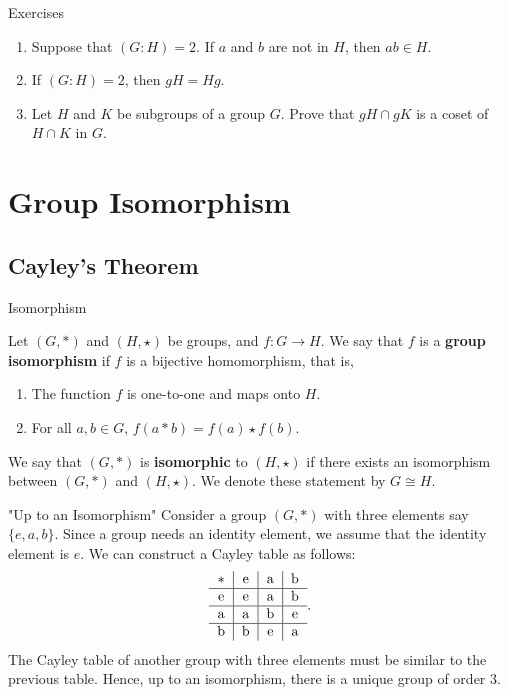 \documentclass{beamer}
\begin{document}
\begin{frame}{Exercises}
    \begin{enumerate}
    \justifying
        \item Suppose that $(G:H)=2$. If $a$ and $b$ are not in $H$, then $ab \in H$.
        \item If $(G:H) = 2$, then $gH = Hg$.
        \item Let $H$ and $K$ be subgroups of a group $G$. Prove that $gH \cap gK$ is a coset of $H \cap K$ in $G$.
    \end{enumerate}
\end{frame}

\section{Group Isomorphism}

\subsection{Cayley's Theorem}

\begin{frame}{Isomorphism}
\begin{definition}
\justifying
Let $(G, *)$ and $(H, \star)$ be groups, and $f : G \rightarrow H$. We say that $f$ is a \textbf{group isomorphism} if $f$ is a bijective homomorphism, that is,
\begin{enumerate}
\justifying
\item The function $f$ is one-to-one and maps onto $H$.
\item For all $a, b \in G$, $f(a * b) = f(a) \star f(b)$.
\end{enumerate}
We say that $(G, *)$ is \textbf{isomorphic} to $(H, \star)$ if there exists an isomorphism between $(G, *)$ and $(H, \star)$. We denote these statement by $G \cong H$.
\end{definition}    
\end{frame}

\begin{frame}{"Up to an Isomorphism"}
\justifying
Consider a group $(G, *)$ with three elements say $\{e, a, b\}$. Since a group needs an identity element, we assume that the identity element is $e$. We can construct a Cayley table as follows:
\[
\begin{tabular}{c|c|c|c}
$\ast$ & e & a & b  \\
\hline
e & e & a & b  \\
\hline
a & a & b & e  \\
\hline
b & b & e & a  \\
\end{tabular}.    
\]
The Cayley table of another group with three elements must be similar to the previous table. Hence, up to an isomorphism, there is a unique group of order 3.
\end{frame}
\end{document}
